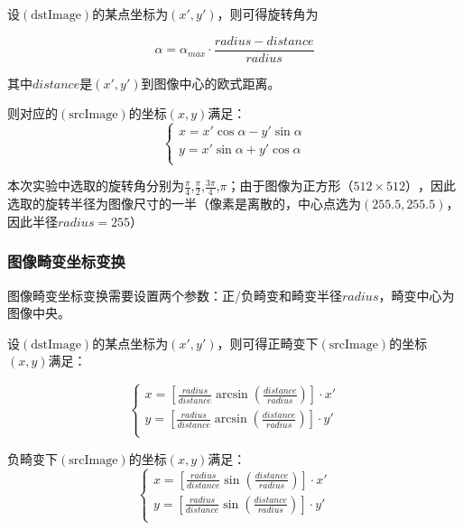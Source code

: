 \documentclass{article}
\begin{document}
设$\mathrm{(dstImage)}$的某点坐标为$(x', y')$，则可得旋转角为

$$\alpha = \alpha_{max} \cdot \frac{radius-distance}{radius}$$

其中$distance$是$(x',y')$到图像中心的欧式距离。

则对应的$\mathrm{(srcImage)}$的坐标$(x,y)$满足：
\begin{equation}
\left\{
	\begin{aligned}
		x = x'\cos{\alpha} - y'\sin{\alpha}\\
		y = x'\sin{\alpha} + y'\cos{\alpha}\\
	\end{aligned}
\right.
\end{equation}

本次实验中选取的旋转角分别为$\frac{\pi}{4}$,$\frac{\pi}{2}$,$\frac{3\pi}{4}$,$\pi$；由于图像为正方形$（512\times512）$，因此选取的旋转半径为图像尺寸的一半（像素是离散的，中心点选为$(255.5,255.5)$，因此半径$radius = 255$）

\subsubsection{图像畸变坐标变换}

图像畸变坐标变换需要设置两个参数：正/负畸变和畸变半径$radius$，畸变中心为图像中央。

设$\mathrm{(dstImage)}$的某点坐标为$(x', y')$，则可得正畸变下$\mathrm{(srcImage)}$的坐标$(x,y)$满足：

\begin{equation}
	\left\{
		\begin{aligned}
			x = [\frac{radius}{distance}\arcsin{(\frac{distance}{radius})}] \cdot x'\\
			y = [\frac{radius}{distance}\arcsin{(\frac{distance}{radius})}] \cdot y'\\
		\end{aligned}
	\right.
\end{equation}

负畸变下$\mathrm{(srcImage)}$的坐标$(x,y)$满足：
\begin{equation}
	\left\{
		\begin{aligned}
			x = [\frac{radius}{distance}\sin{(\frac{distance}{radius})}] \cdot x'\\
			y = [\frac{radius}{distance}\sin{(\frac{distance}{radius})}] \cdot y'\\
		\end{aligned}
	\right.
\end{equation}
\end{document}
